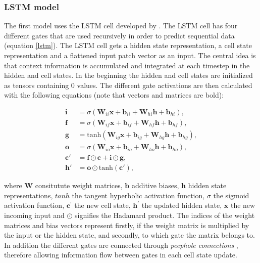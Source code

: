 \documentclass[12pt]{article}
\begin{document}
\subsubsection{LSTM model}
The first model uses the LSTM cell developed by \citet{hochreiter1997long}. The LSTM cell has four different gates that are used recursively in order to predict sequential data (equation \ref{lstm}). The LSTM cell gets a hidden state representation, a cell state representation and a flattened input patch vector as an input. The central idea is that context information is accumulated and integrated at each timestep in the hidden and cell states. In the beginning the hidden and cell states are initialized as tensors containing 0 values. The different gate activations are then calculated with the following equations (note that vectors and matrices are bold):  


\begin{equation}
	\begin{aligned}
		\mathbf{i} &= \sigma(\mathbf{W}_{ii}\mathbf{x} + \mathbf{b}_{ii} + \mathbf{W}_{hi}\mathbf{h} + \mathbf{b}_{hi}), \\
		\mathbf{f} &= \sigma(\mathbf{W}_{if}\mathbf{x} + \mathbf{b}_{if} + \mathbf{W}_{hf}\mathbf{h} + \mathbf{b}_{hf}), \\
		\mathbf{g} &= \mathrm{tanh}(\mathbf{W}_{ig}\mathbf{x} + \mathbf{b}_{ig} + \mathbf{W}_{hg}\mathbf{h} + \mathbf{b}_{hg}), \\
		\mathbf{o} &= \sigma(\mathbf{W}_{io}\mathbf{x} + \mathbf{b}_{io} + \mathbf{W}_{ho}\mathbf{h} + \mathbf{b}_{ho}), \\
		\mathbf{c'} &= \mathbf{f} \odot \mathbf{c} +       \mathbf{i} \odot \mathbf{g}, \\
		\mathbf{h'} &= \mathbf{o} \odot \mathrm{tanh}(\mathbf{c'}),
	\end{aligned}
	\label{lstm}
\end{equation}

where $\mathbf{W}$ consitutute weight matrices, $\mathbf{b}$ additive biases, $\mathbf{h}$ hidden state representations, $tanh$ the tangent hyperbolic activation function, $\sigma$ the sigmoid activation function, $\mathbf{c^{\prime}}$ the new cell state, $\mathbf{h^{\prime}}$ the updated hidden state, $\mathbf{x}$ the new incoming input and $\odot$ signifies the Hadamard product. The indices of the weight matrices and bias vectors represent firstly, if the weight matrix is multiplied by the input or the hidden state, and secondly, to which gate the matrix belongs to. In addition the different gates are connected through \textit{peephole connections} \citep{gers2002learning}, therefore allowing information flow between gates in each cell state update. 
\end{document}
